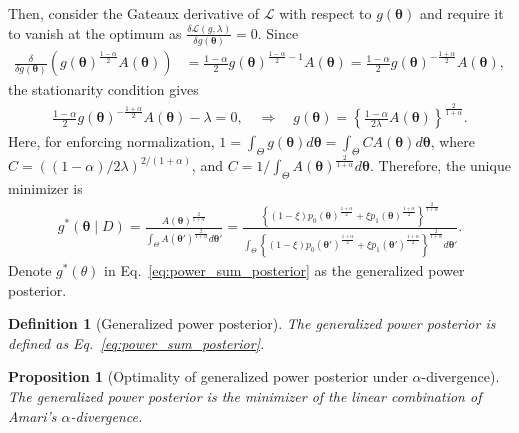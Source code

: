 \documentclass[12pt]{article}
\newtheorem{definition}{Definition}
\newtheorem{proposition}{Proposition}
\begin{document}
Then, consider the Gateaux derivative of $\mathcal{L}$ with respect to $g(\bm{\theta})$ and require it to vanish at the optimum as $\frac{\delta \mathcal{L}(g, \lambda)}{\delta g(\bm{\theta})} = 0$.
Since
\begin{align*}
    \frac{\delta}{\delta g(\bm{\theta})}\left(g(\bm{\theta})^{\frac{1 - \alpha}{2}}A(\bm{\theta})\right) &= \frac{1 - \alpha}{2}g(\bm{\theta})^{\frac{1 - \alpha}{2} - 1}A(\bm{\theta}) = \frac{1 - \alpha}{2}g(\bm{\theta})^{-\frac{1 + \alpha}{2}}A(\bm{\theta}),
\end{align*}
the stationarity condition gives
\begin{align*}
    \frac{1 - \alpha}{2}g(\bm{\theta})^{-\frac{1 + \alpha}{2}}A(\bm{\theta}) - \lambda = 0, \quad \Rightarrow \quad  g(\bm{\theta}) = \left\{ \frac{1 - \alpha}{2\lambda}A(\bm{\theta}) \right\}^{\frac{2}{1 + \alpha}}.
\end{align*}
Here, for enforcing normalization, $1 = \int_\Theta g(\bm{\theta}) d\bm{\theta} = \int_\Theta C A(\bm{\theta}) d\bm{\theta}$, where $C = ((1 - \alpha) / 2\lambda)^{2 / (1 + \alpha)}$, and $C = 1 / \int_\Theta A(\bm{\theta})^{\frac{2}{1 + \alpha}} d\bm{\theta}$.
Therefore, the unique minimizer is
\begin{align}
    g^*(\bm{\theta} \mid D) = \frac{A(\bm{\theta})^{\frac{2}{1 + \alpha}}}{\int_\Theta A(\bm{\theta}')^{\frac{2}{1 + \alpha}} d\bm{\theta}'} = \frac{\left\{(1 - \xi)p_0(\bm{\theta})^{\frac{1 + \alpha}{2}} + \xi p_1(\bm{\theta})^{\frac{1 + \alpha}{2}}\right\}^{\frac{2}{1 + \alpha}}}{\int_\Theta \left\{(1 - \xi) p_0(\bm{\theta}')^{\frac{1 + \alpha}{2}} + \xi p_1(\bm{\theta}')^{\frac{1 + \alpha}{2}}\right\}^{\frac{2}{1 + \alpha}} d\bm{\theta}'}. \label{eq:power_sum_posterior}
\end{align}
Denote $g^*(\theta)$ in Eq.~\eqref{eq:power_sum_posterior} as the generalized power posterior.
\begin{definition}[Generalized power posterior]
    The generalized power posterior is defined as Eq.~\eqref{eq:power_sum_posterior}.
\end{definition}
\begin{proposition}[Optimality of generalized power posterior under $\alpha$-divergence]
The generalized power posterior is the minimizer of the linear combination of Amari's $\alpha$-divergence.
\end{proposition}
\end{document}
